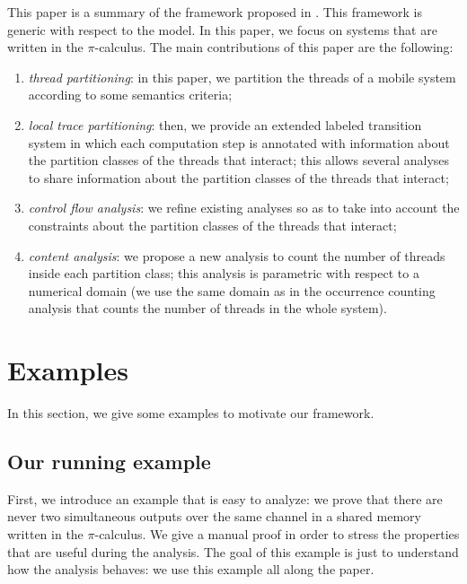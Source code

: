 \documentclass{article}
\newcommand{\picalcul}{$\pi$-calculus}
\begin{document}
This paper is a summary of the framework proposed in \cite[Chap.~10]{feret:thesis}. This framework is generic with respect to the model. In this paper,  we focus on systems that are written in the $\pi$-calculus. The main contributions of this paper are the following:
\begin{enumerate}
\item \emph{thread partitioning}: in this paper, we partition the threads of a mobile system according to some semantics criteria;
\item \emph{local trace partitioning}: then, we provide an extended labeled transition system in which each  computation step is annotated with information about the partition classes of the threads that interact; this  allows several analyses to share information about the partition classes of the threads that interact;
\item \emph{control flow analysis}: we refine existing analyses \cite{feret:sas2000,feret:esop2002,feret:jlap,feret:thesis} so as to take into account the constraints about the partition classes of the threads that interact;
\item \emph{content analysis}: we propose a new analysis to count the number of threads inside each partition class; this analysis is parametric with respect to a numerical domain (we use the same domain as in the occurrence counting analysis \cite{feret:getco2000,feret:jlap,feret:thesis} that counts the number of threads in the whole system).
\end{enumerate}

\section{Examples}
\label{examples}

In this section, we give some examples to motivate our framework. 

\subsection{Our running example}

First, we introduce an example that is easy to analyze: we  prove that there are never two simultaneous outputs over the same channel in a shared memory written in the \picalcul.  We give a manual proof in order to stress the  properties that are useful during the analysis. The goal of this example is just to understand how the analysis behaves: we use this example all along the paper. 
\end{document}
